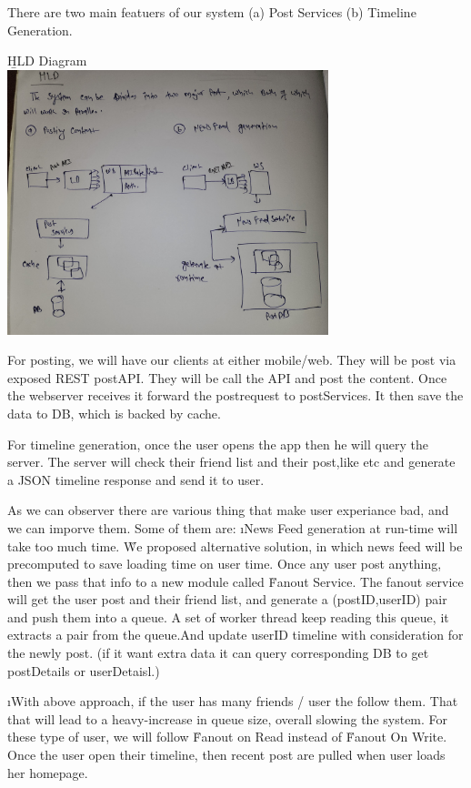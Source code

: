There are two main featuers of our system (a) Post Services (b) Timeline Generation.

    \b{HLD Diagram}\\
    \includegraphics[width=0.7\textwidth]{resources/news-feed-hld.jpg}    



For posting, we will have our clients at either mobile/web. They will be post via exposed REST postAPI. They will be call the API and post the content. Once the webserver receives it forward the postrequest to postServices. It then save the data to DB, which is backed by cache.

For timeline generation, once the user opens the app then he will query the server. The server will check their friend list and their post,like etc and generate a JSON timeline response and send it to user.


As we can observer there are various thing that make user experiance bad, and we can imporve them. Some of them are:
\lstart
    \i News Feed generation at run-time will take too much time. 
    \r We proposed alternative solution, in which news feed will be precomputed to save loading time on user time. Once any user post anything, then we pass that info to a new module called \u{Fanout Service}. The fanout service will get the user post and their friend list, and generate a (postID,userID) pair and push them into a queue. A set of worker thread keep reading this queue, it extracts a pair from the queue.And update userID timeline with consideration for the newly post. (if it want extra data it can query corresponding DB to get postDetails or userDetaisl.)

    \i With above approach, if the user has many friends / user the follow them. That that will lead to a heavy-increase in queue size, overall slowing the system. For these type of user, we will follow \u{Fanout on Read} instead of \u{Fanout On Write}. Once the user open their timeline, then recent post are pulled when user loads her homepage.


